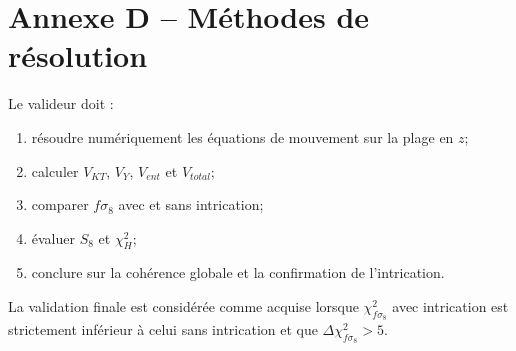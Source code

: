 \section{Annexe D -- Méthodes de résolution}
Le valideur doit :
\begin{enumerate}
    \item résoudre numériquement les équations de mouvement sur la plage en $z$;
    \item calculer $V_{KT}$, $V_Y$, $V_{ent}$ et $V_{total}$;
    \item comparer $f\sigma_8$ avec et sans intrication;
    \item évaluer $S_8$ et $\chi^2_H$;
    \item conclure sur la cohérence globale et la confirmation de l'intrication.
\end{enumerate}
La validation finale est considérée comme acquise lorsque $\chi^2_{f\sigma_8}$ avec intrication est strictement inférieur à celui sans intrication et que $\Delta\chi^2_{f\sigma_8}>5$.